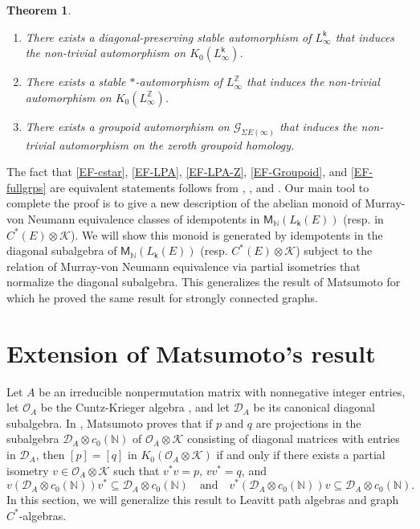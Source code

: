 \documentclass[11pt, letterpaper,final]{amsart}
\newcommand{\NN}{\mathbb{N}}
\newcommand{\Kk}{\mathcal{K}}
\newcommand{\D}{\mathcal{D}}
\newtheorem{theoremintro}{Theorem}
\theoremstyle{definition}
\theoremstyle{remark}
\begin{document}
\begin{theoremintro}
\begin{enumerate}[label=\textbf{D.\arabic*}]
    \item \label{Linfty} There exists a diagonal-preserving stable automorphism of $L_\infty^{\mathsf{k}}$ that induces the non-trivial automorphism on $K_0(L^\mathsf{k}_\infty)$.

    \item \label{Linfty-Z} There exists a stable $*$-automorphism of $L_{\infty}^\mathbb{Z}$ that induces the non-trivial automorphism on $K_0(L^\mathbb{Z}_\infty)$.

    \item \label{Groupoid} There exists a groupoid automorphism on $\mathcal{G}_{\Sigma E(\infty)}$ that induces the non-trivial automorphism on the zeroth groupoid homology.
\end{enumerate}
\end{theoremintro}


The fact that \eqref{EF-cstar}, \eqref{EF-LPA}, \eqref{EF-LPA-Z}, \eqref{EF-Groupoid}, and \eqref{EF-fullgrps} are equivalent statements follows from \cite[Corollary~4.3 and Corollary~4.4]{ABHS}, \cite[Theorem~1]{TCadv}, and \cite[Theorem~D]{NO2019}.  Our main tool to complete the proof is to give a new description of the abelian monoid of Murray-von Neumann equivalence classes of idempotents in $\mathsf{M}_\mathbb{N}(L_\mathsf{k}(E))$ (resp. in $C^*(E) \otimes \Kk$).  We will show this monoid is generated by idempotents in the diagonal subalgebra of $\mathsf{M}_\mathbb{N}(L_\mathsf{k}(E))$ (resp. $C^*(E) \otimes \Kk$) subject to the relation of Murray-von Neumann equivalence via partial isometries that normalize the diagonal subalgebra.  This generalizes the result of Matsumoto \cite{KM2013} for which he proved the same result for strongly connected graphs.


\section{Extension of Matsumoto's result}

Let $A$ be an irreducible nonpermutation matrix with nonnegative integer entries, let $\mathcal{O}_A$ be the Cuntz-Krieger algebra \cite{CK80}, and let $\D_A$ be its canonical diagonal subalgebra.  In \cite{KM2013}, Matsumoto proves that if $p$ and $q$ are projections in the subalgebra $\mathcal{D}_A \otimes c_0(\NN)$ of $\mathcal{O}_A \otimes \Kk$ consisting of diagonal matrices with entries in $\D_A$, then $[p] = [q]$ in $K_0( \mathcal{O}_A \otimes \Kk )$ if and only if there exists a partial isometry $v \in \mathcal{O}_A \otimes \Kk$ such that $v^*v = p$, $vv^* = q$, and 
$$
v (\mathcal{D}_A \otimes c_0(\NN)) v^* \subseteq \mathcal{D}_A \otimes c_0(\NN) \quad \text{and} \quad v^* (\mathcal{D}_A \otimes c_0(\NN))v \subseteq \mathcal{D}_A \otimes c_0(\NN).
$$
In this section, we will generalize this result to Leavitt path algebras and graph $C^*$-algebras.
\end{document}
